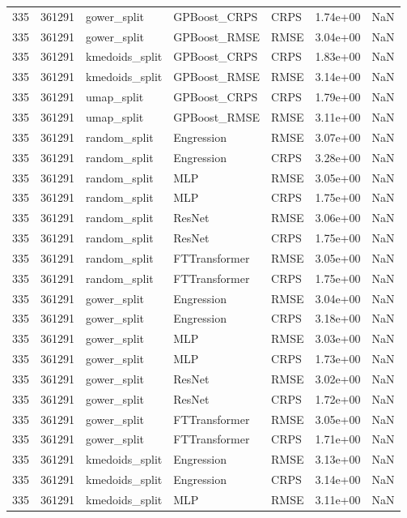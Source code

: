 \begin{tabular}{rrlllrr}
335 & 361291 & gower\_split & GPBoost\_CRPS & CRPS & 1.74e+00 & NaN \\
335 & 361291 & gower\_split & GPBoost\_RMSE & RMSE & 3.04e+00 & NaN \\
335 & 361291 & kmedoids\_split & GPBoost\_CRPS & CRPS & 1.83e+00 & NaN \\
335 & 361291 & kmedoids\_split & GPBoost\_RMSE & RMSE & 3.14e+00 & NaN \\
335 & 361291 & umap\_split & GPBoost\_CRPS & CRPS & 1.79e+00 & NaN \\
335 & 361291 & umap\_split & GPBoost\_RMSE & RMSE & 3.11e+00 & NaN \\
335 & 361291 & random\_split & Engression & RMSE & 3.07e+00 & NaN \\
335 & 361291 & random\_split & Engression & CRPS & 3.28e+00 & NaN \\
335 & 361291 & random\_split & MLP & RMSE & 3.05e+00 & NaN \\
335 & 361291 & random\_split & MLP & CRPS & 1.75e+00 & NaN \\
335 & 361291 & random\_split & ResNet & RMSE & 3.06e+00 & NaN \\
335 & 361291 & random\_split & ResNet & CRPS & 1.75e+00 & NaN \\
335 & 361291 & random\_split & FTTransformer & RMSE & 3.05e+00 & NaN \\
335 & 361291 & random\_split & FTTransformer & CRPS & 1.75e+00 & NaN \\
335 & 361291 & gower\_split & Engression & RMSE & 3.04e+00 & NaN \\
335 & 361291 & gower\_split & Engression & CRPS & 3.18e+00 & NaN \\
335 & 361291 & gower\_split & MLP & RMSE & 3.03e+00 & NaN \\
335 & 361291 & gower\_split & MLP & CRPS & 1.73e+00 & NaN \\
335 & 361291 & gower\_split & ResNet & RMSE & 3.02e+00 & NaN \\
335 & 361291 & gower\_split & ResNet & CRPS & 1.72e+00 & NaN \\
335 & 361291 & gower\_split & FTTransformer & RMSE & 3.05e+00 & NaN \\
335 & 361291 & gower\_split & FTTransformer & CRPS & 1.71e+00 & NaN \\
335 & 361291 & kmedoids\_split & Engression & RMSE & 3.13e+00 & NaN \\
335 & 361291 & kmedoids\_split & Engression & CRPS & 3.14e+00 & NaN \\
335 & 361291 & kmedoids\_split & MLP & RMSE & 3.11e+00 & NaN \\

\end{tabular}
